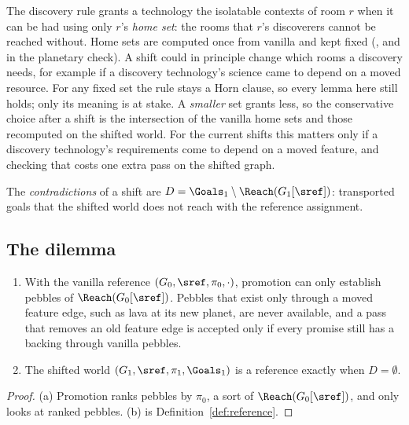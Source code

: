 \begin{remark}\label{rem:homesets}
The discovery rule grants a technology the isolatable contexts of room $r$ when it can be had using only $r$'s \emph{home set}: the rooms that $r$'s discoverers cannot be reached without. Home sets are computed once from vanilla and kept fixed (, and  in the planetary check). A shift could in principle change which rooms a discovery needs, for example if a discovery technology's science came to depend on a moved resource. For any fixed set the rule stays a Horn clause, so every lemma here still holds; only its meaning is at stake. A \emph{smaller} set grants less, so the conservative choice after a shift is the intersection of the vanilla home sets and those recomputed on the shifted world. For the current shifts this matters only if a discovery technology's requirements come to depend on a moved feature, and checking that costs one extra  pass on the shifted graph.
\end{remark}

\begin{definition}[Contradictions]
The \emph{contradictions} of a shift are $D=\Goals_1\setminus\Reach(G_1[\sref])$: transported goals that the shifted world does not reach with the reference assignment.
\end{definition}

\subsection{The dilemma}

\begin{proposition}\label{prop:dilemma}
\leavevmode
\begin{enumerate}[nosep,label=(\alph*)]
\item With the vanilla reference $(G_0,\sref,\pi_0,\cdot)$, promotion can only establish pebbles of $\Reach(G_0[\sref])$. Pebbles that exist only through a moved feature edge, such as lava at its new planet, are never available, and a pass that removes an old feature edge is accepted only if every promise still has a backing through vanilla pebbles.
\item The shifted world $(G_1,\sref,\pi_1,\Goals_1)$ is a reference exactly when $D=\emptyset$.
\end{enumerate}
\end{proposition}
\begin{proof}
(a) Promotion ranks pebbles by $\pi_0$, a sort of $\Reach(G_0[\sref])$, and  only looks at ranked pebbles. (b) is Definition~\ref{def:reference}.
\end{proof}

